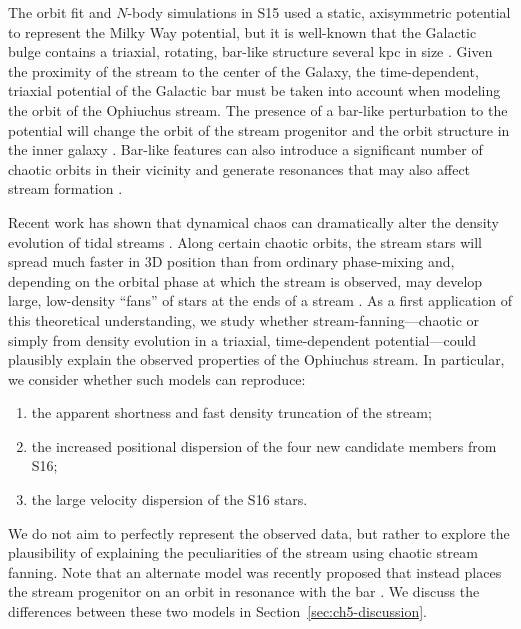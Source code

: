The orbit fit and $N$-body simulations in S15 used a static, axisymmetric
potential to represent the Milky Way potential, but it is well-known that the
Galactic bulge contains a triaxial, rotating, bar-like structure several kpc in
size \citep[e.g.,][]{blitz91, weinberg92, dwek95, wegg13}. Given the proximity
of the stream to the center of the Galaxy, the time-dependent, triaxial
potential of the Galactic bar must be taken into account when modeling the orbit
of the Ophiuchus stream. The presence of a bar-like perturbation to the
potential will change the orbit of the stream progenitor and the orbit structure
in the inner galaxy \citep{zotos12, portail15b, gajda15}. Bar-like features can
also introduce a significant number of chaotic orbits in their vicinity
\citep{weinberg15} and generate resonances that may also affect stream formation
\citep{hattori15}.

Recent work has shown that dynamical chaos can dramatically alter the density
evolution of tidal streams \citep[e.g.,][]{fardal14, apw15-chaos}. Along certain
chaotic orbits, the stream stars will spread much faster in 3D position than
from ordinary phase-mixing and, depending on the orbital phase at which the
stream is observed, may develop large, low-density ``fans'' of stars at the ends
of a stream \citep{pearson15, apw15-chaos}. As a first application of this
theoretical understanding, we study whether stream-fanning---chaotic or simply
from density evolution in a triaxial, time-dependent potential---could plausibly
explain the observed properties of the Ophiuchus stream. In particular, we
consider whether such models can reproduce:
\begin{enumerate}
	\item the apparent shortness and fast density truncation of the stream;
	\item the increased positional dispersion of the four new candidate members from S16;
	\item the large velocity dispersion of the S16 stars.
\end{enumerate}
We do not aim to perfectly represent the observed data, but rather to explore
the plausibility of explaining the peculiarities of the stream using chaotic
stream fanning. Note that an alternate model was recently proposed that instead
places the stream progenitor on an orbit in resonance with the bar
\citep{hattori15}. We discuss the differences between these two models in
Section~\ref{sec:ch5-discussion}.

